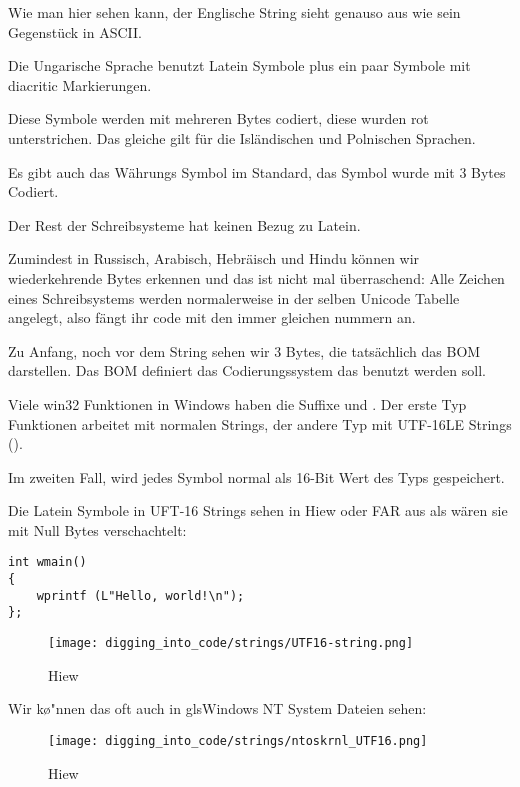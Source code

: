 Wie man hier sehen kann, der Englische String sieht genauso aus wie sein Gegenst\"uck in ASCII.

Die Ungarische Sprache benutzt Latein Symbole plus ein paar Symbole mit diacritic Markierungen.

Diese Symbole werden mit mehreren Bytes codiert, diese wurden rot unterstrichen.
Das gleiche gilt f\"ur die Isl\"andischen und Polnischen Sprachen.

Es gibt auch das  W\"ahrungs Symbol im Standard, das Symbol wurde mit 3 Bytes Codiert.

Der Rest der Schreibsysteme hat keinen Bezug zu Latein.

Zumindest in Russisch, Arabisch, Hebr\"aisch und Hindu k\"onnen wir wiederkehrende Bytes erkennen und das ist nicht mal \"uberraschend:
Alle Zeichen eines Schreibsystems werden normalerweise in der selben Unicode Tabelle angelegt, also f\"angt ihr code mit den 
immer gleichen nummern an. %

Zu Anfang, noch vor dem  String sehen wir 3 Bytes, die tats\"achlich das \ac{BOM} darstellen.
Das \ac{BOM} definiert das Codierungssystem das benutzt werden soll.


Viele win32 Funktionen in Windows haben die Suffixe  und . 
Der erste Typ Funktionen arbeitet mit normalen Strings, der andere Typ mit 
UTF-16LE Strings (). 

Im zweiten Fall, wird jedes Symbol normal als 16-Bit Wert des Typs  gespeichert.

Die Latein Symbole in UFT-16 Strings sehen in Hiew oder FAR aus als w\"aren sie mit Null Bytes verschachtelt:

\begin{lstlisting}[style=customc]
int wmain()
{
	wprintf (L"Hello, world!\n");
};
\end{lstlisting}

\begin{figure}[H]
\centering
\texttt{[image: digging\_into\_code/strings/UTF16-string.png]}
\caption{Hiew}
\end{figure}

Wir k\o"nnen das oft auch in gls{Windows NT} System Dateien sehen:

\begin{figure}[H]
\centering
\texttt{[image: digging\_into\_code/strings/ntoskrnl\_UTF16.png]}
\caption{Hiew}
\end{figure}

